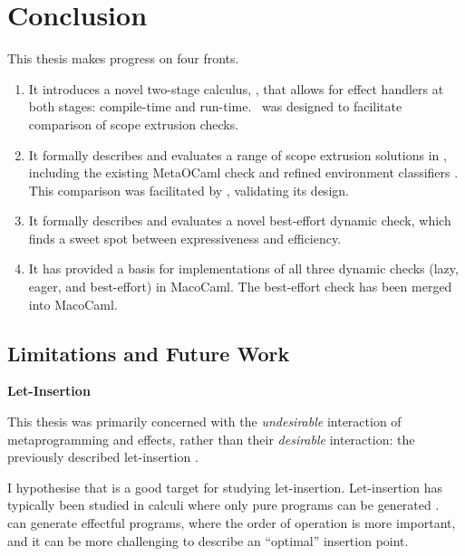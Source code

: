 \chapter{Conclusion}

This thesis makes progress on four fronts. 

\begin{enumerate}
\item It introduces a novel two-stage calculus, \calculusName{}, that allows for effect handlers at both stages: compile-time and run-time.\ \calculusName{} was designed to facilitate comparison of scope extrusion checks.

\item It formally describes and evaluates a range of scope extrusion solutions in \calculusName{}, including the existing MetaOCaml check \citep{kiselyov-14} and refined environment classifiers \citep{kiselyov-16}. This comparison was facilitated by \calculusName{}, validating its design.

\item It formally describes and evaluates a novel best-effort dynamic check, which finds a sweet spot between expressiveness and efficiency.

\item It has provided a basis for implementations of all three dynamic checks (lazy, eager, and best-effort) in MacoCaml. The best-effort check has been merged into MacoCaml.
\end{enumerate}

\section{Limitations and Future Work}
\begin{minipage}[t]{0.25\textwidth}
  \textbf{\textsf{Let-Insertion}}
\end{minipage}%
\begin{minipage}[t]{0.75\textwidth}
  This thesis was primarily concerned with the \textit{undesirable} interaction of metaprogramming and effects, rather than their \textit{desirable} interaction: the previously described let-insertion \citep{yallop-2019}. 
  \vspace{2mm}

  I hypothesise that \calculusName{} is a good target for studying let-insertion. Let-insertion has typically been studied in calculi where only pure programs can be generated \citep{isoda-24}.\ \calculusName{} can generate effectful programs, where the order of operation is more important, and it can be more challenging to describe an ``optimal'' insertion point.
  \vspace{4mm}
\end{minipage}\\

